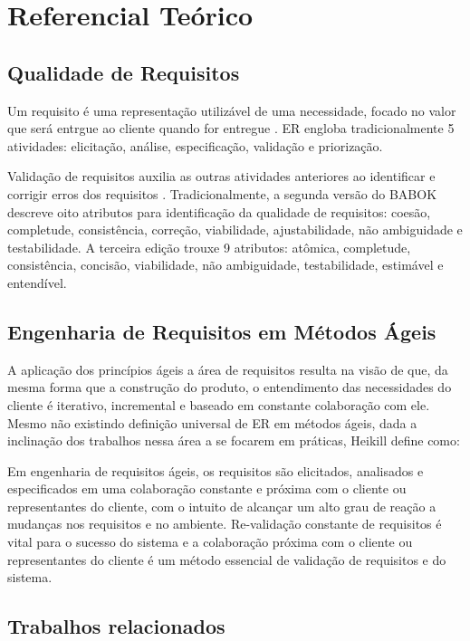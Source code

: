 \section{Referencial Teórico}

\subsection{Qualidade de Requisitos}
Um requisito é uma representação utilizável de uma necessidade, focado no valor que será entrgue ao cliente quando for entregue \cite{Babok_2015}. ER engloba tradicionalmente 5 atividades: elicitação, análise, especificação, validação e priorização.

Validação de requisitos auxilia as outras atividades anteriores ao identificar e corrigir erros dos requisitos \cite{Heikkil_2015}. Tradicionalmente, a segunda versão do BABOK \cite{Babok_2009} descreve oito atributos para identificação da qualidade de requisitos: coesão, completude, consistência, correção, viabilidade, ajustabilidade, não ambiguidade e testabilidade. A terceira edição \cite{Babok_2015} trouxe 9 atributos: atômica, completude, consistência, concisão, viabilidade, não ambiguidade, testabilidade, estimável e entendível.

\subsection{Engenharia de Requisitos em Métodos Ágeis}
A aplicação dos princípios ágeis a área de requisitos resulta na visão de que, da mesma forma que a construção do produto, o entendimento das necessidades do cliente é iterativo, incremental e baseado em constante colaboração com ele. Mesmo não existindo definição universal de ER em métodos ágeis, dada a inclinação dos trabalhos nessa área a se focarem em práticas, Heikill \cite{Heikkil_2015} define como:

\begin{displayquote}
Em engenharia de requisitos ágeis, os requisitos são elicitados, analisados e especificados em uma colaboração constante e próxima com o cliente ou representantes do cliente, com o intuito de alcançar um alto grau de reação a mudanças nos requisitos e no ambiente. Re-validação constante de requisitos é vital para o sucesso do sistema e a colaboração próxima com o cliente ou representantes do cliente é um método essencial de validação de requisitos e do sistema.
\end{displayquote}

\subsection{Trabalhos relacionados}


